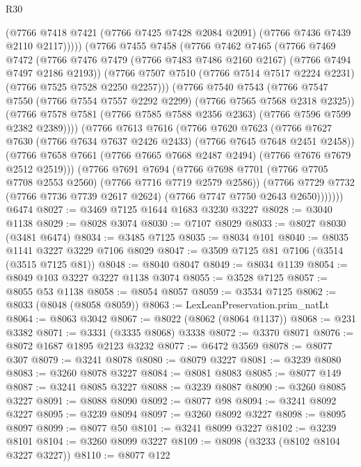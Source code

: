 \begin{lexlean}{R30}
\begin{coremodule}
              (@7766 @7418 @7421 (@7766 @7425 @7428 @2084 @2091) (@7766 @7436 @7439 @2110 @2117)))))
        (@7766
          @7455
          @7458
          (@7766
            @7462
            @7465
            (@7766
              @7469
              @7472
              (@7766 @7476 @7479 (@7766 @7483 @7486 @2160 @2167) (@7766 @7494 @7497 @2186 @2193))
              (@7766 @7507 @7510 (@7766 @7514 @7517 @2224 @2231) (@7766 @7525 @7528 @2250 @2257)))
            (@7766
              @7540
              @7543
              (@7766 @7547 @7550 (@7766 @7554 @7557 @2292 @2299) (@7766 @7565 @7568 @2318 @2325))
              (@7766 @7578 @7581 (@7766 @7585 @7588 @2356 @2363) (@7766 @7596 @7599 @2382 @2389))))
          (@7766
            @7613
            @7616
            (@7766
              @7620
              @7623
              (@7766 @7627 @7630 (@7766 @7634 @7637 @2426 @2433) (@7766 @7645 @7648 @2451 @2458))
              (@7766 @7658 @7661 (@7766 @7665 @7668 @2487 @2494) (@7766 @7676 @7679 @2512 @2519)))
            (@7766
              @7691
              @7694
              (@7766 @7698 @7701 (@7766 @7705 @7708 @2553 @2560) (@7766 @7716 @7719 @2579 @2586))
              (@7766
                @7729
                @7732
                (@7766 @7736 @7739 @2617 @2624)
                (@7766 @7747 @7750 @2643 @2650)))))))
    @6474
@8027 := @3469 @7125 @1644 @1683 @3230 @3227
@8028 := @3040 @1138
@8029 := @8028 @3074
@8030 := @7107 @8029
@8033 := @8027 @8030 (@3481 @6474)
@8034 := @3485 @7125
@8035 := @8034 @101
@8040 := @8035 @1141 @3227 @3229 @7106 @8029
@8047 := @3509 @7125 @81 @7106 (@3514 (@3515 @7125 @81))
@8048 := @8040 @8047
@8049 := @8034 @1139
@8054 := @8049 @103 @3227 @3227 @1138 @3074
@8055 := @3528 @7125
@8057 := @8055 @53 @1138
@8058 := @8054 @8057
@8059 := @3534 @7125
@8062 := @8033 (@8048 (@8058 @8059))
@8063 := LexLeanPreservation.prim_natLt
@8064 := @8063 @3042
@8067 := @8022 (@8062 (@8064 @1137))
@8068 := @231 @3382
@8071 := @3331 (@3335 @8068) @3338
@8072 := @3370 @8071
@8076 := @8072 @1687 @1895 @2123 @3232
@8077 := @6472 @3569
@8078 := @8077 @307
@8079 := @3241 @8078
@8080 := @8079 @3227
@8081 := @3239 @8080
@8083 := @3260 @8078 @3227
@8084 := @8081 @8083
@8085 := @8077 @149
@8087 := @3241 @8085 @3227
@8088 := @3239 @8087
@8090 := @3260 @8085 @3227
@8091 := @8088 @8090
@8092 := @8077 @98
@8094 := @3241 @8092 @3227
@8095 := @3239 @8094
@8097 := @3260 @8092 @3227
@8098 := @8095 @8097
@8099 := @8077 @50
@8101 := @3241 @8099 @3227
@8102 := @3239 @8101
@8104 := @3260 @8099 @3227
@8109 := @8098 (@3233 (@8102 @8104 @3227 @3227))
@8110 := @8077 @122

\end{coremodule}
\end{lexlean}
